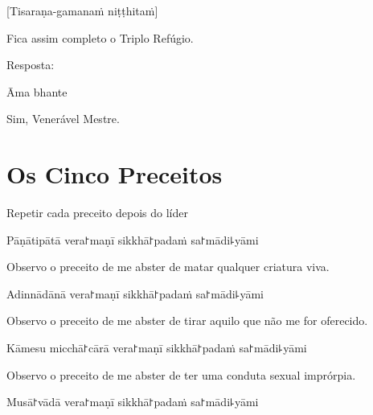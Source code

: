 [Tisaraṇa-gamanaṁ niṭṭhitaṁ]

\begin{english}
  Fica assim completo o Triplo Refúgio.
\end{english}

\begin{instruction}
  Resposta:
\end{instruction}

Āma bhante

\begin{english}
  Sim, Venerável Mestre.
\end{english}

\chapter{Os Cinco Preceitos}

\begin{instruction}
  Repetir cada preceito depois do líder
\end{instruction}

\begin{precept}
  \setcounter{enumi}{0}
  \item Pāṇātipātā vera꜓maṇī sikkhā꜓padaṁ sa꜓mādi꜕yāmi
\end{precept}

\begin{english}
  Observo o preceito de me abster de matar qualquer criatura viva.
\end{english}

\begin{precept}
  \setcounter{enumi}{1}
  \item Adinnādānā vera꜓maṇī sikkhā꜓padaṁ sa꜓mādi꜕yāmi
\end{precept}

\begin{english}
  Observo o preceito de me abster de tirar aquilo que não me for oferecido.
\end{english}

\begin{precept}
  \setcounter{enumi}{2}
  \item Kāmesu micchā꜓cārā vera꜓maṇī sikkhā꜓padaṁ sa꜓mādi꜕yāmi
\end{precept}

\begin{english}
  Observo o preceito de me abster de ter uma conduta sexual imprórpia.
\end{english}

\begin{precept}
  \setcounter{enumi}{3}
  \item Musā꜓vādā vera꜓maṇī sikkhā꜓padaṁ sa꜓mādi꜕yāmi
\end{precept}

